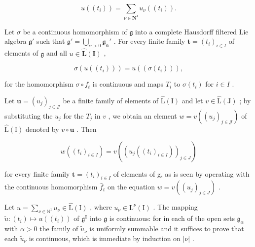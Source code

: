 \[
u ((t _ {i})) = \sum_ {\nu \in \mathbf {N} ^ {\mathrm{I}}} u _ {\nu} ((t _ {i})).\tag{5}
\]

Let \(\sigma\) be a continuous homomorphism of \(\mathfrak{g}\) into a complete Hausdorff filtered Lie algebra \(\mathfrak{g}'\) such that \(\mathfrak{g}' = \bigcup_{\alpha > 0} \mathfrak{g}_{\alpha}'\) . For every finite family \(\boldsymbol{t} = (t_i)_{i \in I}\) of elements of \(\mathfrak{g}\) and all \(u \in \hat{\mathbf{L}}(\mathbf{I})\) ,

\[
\sigma (u ((t _ {i}))) = u ((\sigma (t _ {i}))),\tag{6}
\]

for the homomorphism \(\sigma \circ f_t\) is continuous and maps \(T_i\) to \(\sigma(t_i)\) for \(i \in I\) .

Let \(\boldsymbol{u} = (u_j)_{j \in \mathcal{J}}\) be a finite family of elements of \(\hat{\mathrm{L}}(\mathrm{I})\) and let \(v \in \hat{\mathrm{L}}(\mathrm{J})\) ; by substituting the \(u_j\) for the \(T_j\) in \(v\) , we obtain an element \(w = v((u_j)_{j \in \mathcal{J}})\) of \(\hat{\mathrm{L}}(\mathrm{I})\) denoted by \(v \circ \boldsymbol{u}\) . Then

\[
w ((t _ {i}) _ {i \in I}) = v ((u _ {j} ((t _ {i}) _ {i \in I})) _ {j \in J})\tag{7}
\]

for every finite family \(\boldsymbol{t} = (t_{i})_{i \in I}\) of elements of g, as is seen by operating with the continuous homomorphism \(\hat{f}_{t}\) on the equation \(w = v((u_{j})_{j \in J})\) .

Let \(u = \sum_{\nu \in \mathbb{N}^{\mathbf{I}}} u_{\nu} \in \hat{\mathrm{L}}(\mathrm{I})\) , where \(u_{\nu} \in \mathrm{L}^{\nu}(\mathrm{I})\) . The mapping \(\tilde{u}\colon (t_i)\mapsto u((t_i))\) of \(\mathfrak{g}^{\mathbf{I}}\) into \(\mathfrak{g}\) is continuous: for in each of the open sets \(\mathfrak{g}_{\alpha}\) with \(\alpha > 0\) the family of \(\tilde{u}_{\nu}\) is uniformly summable and it suffices to prove that each \(\tilde{u}_{\nu}\) is continuous, which is immediate by induction on \(|\nu|\) .

